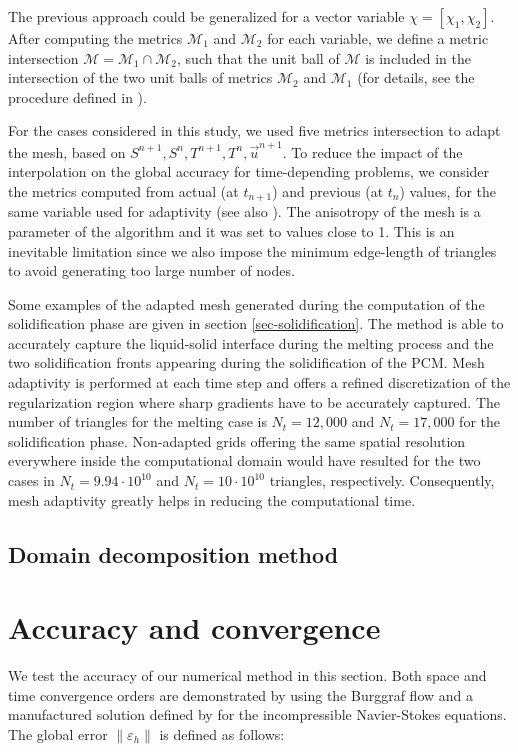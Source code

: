 The previous approach could be generalized for a vector variable $\chi=[\chi_1, \chi_2]$.
After computing the metrics $\mathcal{M}_{1}$ and $\mathcal{M}_{2}$ for each variable, we define a metric intersection  $\mathcal{M} = \mathcal{M}_{1} \cap \mathcal{M}_{2}$,
such that the unit ball of $\mathcal{M}$ is included in  the intersection of the two  unit balls  of metrics $\mathcal{M}_{2}$ and $\mathcal{M}_{1}$ (for details, see the  procedure defined in \cite{frey-george-1999}). 

For the cases considered in this study, we used five metrics intersection to adapt the mesh, based on $S^{n+1}, S^{n}, T^{n+1}, T^{n}, \vec{u}^{n+1}$. To reduce the impact of the interpolation on the global accuracy for time-depending problems, we consider the metrics computed from actual (at $t_{n+1}$) and  previous (at $t_{n}$) values, for the same variable used for adaptivity (see also \cite{Belhamadia2004_S}).
The anisotropy of the mesh is a parameter of the algorithm and it was set to values close to 1. This is an inevitable limitation since we also impose the minimum edge-length of triangles to avoid generating too large number of nodes.

Some examples of the adapted mesh generated during the computation of the solidification phase are given in section \ref{sec-solidification}.
The method is able to accurately capture the liquid-solid interface during the melting process and the two solidification fronts appearing during the solidification of the PCM. 
Mesh adaptivity is performed at each time step and offers a refined discretization of the regularization region where sharp gradients have to be accurately captured.  The number of triangles for the melting case is $N_t=12,000$ and $N_t=17,000$ for the solidification phase. Non-adapted grids offering the same spatial resolution everywhere inside the computational domain would have resulted for the two cases in $N_t=9.94 \cdot 10^{10}$ and $N_t=10 \cdot 10^{10}$ triangles, respectively. Consequently, mesh adaptivity greatly helps in reducing the computational time. 


\subsection{Domain decomposition method}



\section{Accuracy and convergence} \label{subsec-conv}
We test the accuracy of our numerical method in this section.
Both space and time convergence orders are demonstrated by using the Burggraf flow and a manufactured solution defined by \cite{nourgaliev2016fully} for the incompressible Navier-Stokes equations.
The global error $ \| \varepsilon_h \|$ is defined as follows:

